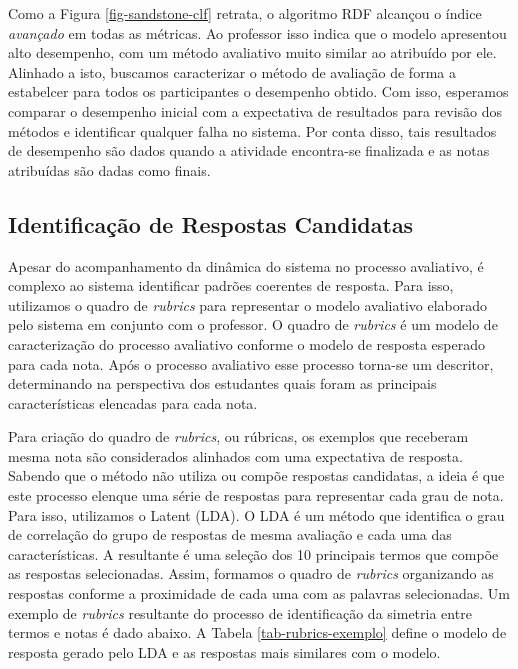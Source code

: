 Como a Figura \ref{fig-sandstone-clf} retrata, o algoritmo RDF alcançou o índice \textit{avançado} em todas as métricas. Ao professor isso indica que o modelo apresentou alto desempenho, com um método avaliativo muito similar ao atribuído por ele. Alinhado a isto, buscamos caracterizar o método de avaliação de forma a estabelcer para todos os participantes o desempenho obtido. Com isso, esperamos comparar o desempenho inicial com a expectativa de resultados para revisão dos métodos e identificar qualquer falha no sistema. Por conta disso, tais resultados de desempenho são dados quando a atividade encontra-se finalizada e as notas atribuídas são dadas como finais.

\subsection{Identificação de Respostas Candidatas}
\label{subsec-padroes-resposta}

Apesar do acompanhamento da dinâmica do sistema no processo avaliativo, é complexo ao sistema identificar padrões coerentes de resposta. Para isso, utilizamos o quadro de \textit{rubrics} para representar o modelo avaliativo elaborado pelo sistema em conjunto com o professor. O quadro de \textit{rubrics} é um modelo de caracterização do processo avaliativo conforme o modelo de resposta esperado para cada nota. Após o processo avaliativo esse processo torna-se um descritor, determinando na perspectiva dos estudantes quais foram as principais características elencadas para cada nota. 

Para criação do quadro de \textit{rubrics}, ou rúbricas, os exemplos que receberam mesma nota são considerados alinhados com uma expectativa de resposta. Sabendo que o método não utiliza ou compõe respostas candidatas, a ideia é que este processo elenque uma série de respostas para representar cada grau de nota. Para isso, utilizamos o Latent (LDA). O LDA é um método que identifica o grau de correlação do grupo de respostas de mesma avaliação e cada uma das características. A resultante é uma seleção dos 10 principais termos que compõe as respostas selecionadas. Assim, formamos o quadro de \textit{rubrics} organizando as respostas conforme a proximidade de cada uma com as palavras selecionadas. Um exemplo de \textit{rubrics} resultante do processo de identificação da simetria entre termos e notas é dado abaixo. A Tabela \ref{tab-rubrics-exemplo} define o modelo de resposta gerado pelo LDA e as respostas mais similares com o modelo.


